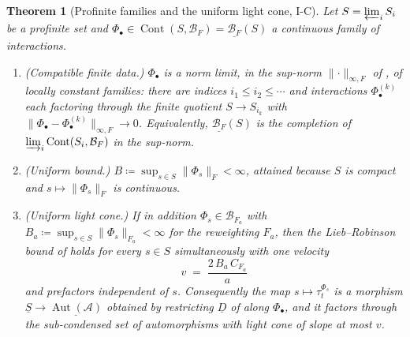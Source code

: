 \documentclass[12pt]{article}
\newcommand{\cond}[1]{\underline{#1}}          %
\newcommand{\Cont}{\operatorname{Cont}}        %
\newcommand{\Ffun}{F}                          %
\newcommand{\BF}{\mathcal{B}_{F}}              %
\newcommand{\qA}{\mathcal{A}}
\newcommand{\Aut}{\operatorname{Aut}}
\newcommand{\norm}[1]{\lVert #1\rVert}
\newcommand{\Fnorm}[1]{\lVert #1\rVert_{F}}
\newcommand{\Fanorm}[1]{\lVert #1\rVert_{F_a}}
\newcommand{\eqdef}{\coloneqq}
\newtheorem{theorem}{Theorem}[section]
\theoremstyle{definition}
\theoremstyle{remark}
\begin{document}
\begin{theorem}[Profinite families and the uniform light cone, I-C]
\label{thm:uniform-lr}
Let $S=\varprojlim_i S_i$ be a profinite set and $\Phi_\bullet\in\Cont(S,\BF)=\cond{\BF}(S)$ a
continuous family of interactions.
\begin{enumerate}
\item \emph{(Compatible finite data.)} $\Phi_\bullet$ is a norm limit, in the sup-norm
  $\norm{\cdot}_{\infty,\Ffun}$ of , of locally constant families:
  there are indices $i_1\le i_2\le\cdots$ and interactions
  $\Phi^{(k)}_\bullet$ each factoring through the finite quotient $S\to S_{i_k}$ with
  $\norm{\Phi_\bullet-\Phi^{(k)}_\bullet}_{\infty,\Ffun}\to 0$. Equivalently,
  $\cond{\BF}(S)$ is the completion of $\varinjlim_i\Cont(S_i,\BF)$ in the sup-norm.
\item \emph{(Uniform bound.)} $B\eqdef\sup_{s\in S}\Fnorm{\Phi_s}<\infty$, attained because
  $S$ is compact and $s\mapsto\Fnorm{\Phi_s}$ is continuous.
\item \emph{(Uniform light cone.)} If in addition $\Phi_s\in\mathcal B_{\Ffun_a}$ with
  $B_a\eqdef\sup_{s\in S}\Fanorm{\Phi_s}<\infty$ for the reweighting $\Ffun_a$, then the
  Lieb--Robinson bound of  holds for every $s\in S$ simultaneously with
  \emph{one} velocity
  \[
    v \;=\; \frac{2\,B_a\,C_{\Ffun_a}}{a}
  \]
  and prefactors independent of $s$. Consequently the map $s\mapsto\tau^{\Phi_s}_t$ is a
  morphism $\cond{S}\to\cond{\Aut(\qA)}$ obtained by restricting $\cond{D}$ of
   along $\Phi_\bullet$, and it factors through the sub-condensed
  set of automorphisms with light cone of slope at most $v$.
\end{enumerate}
\end{theorem}
\end{document}
